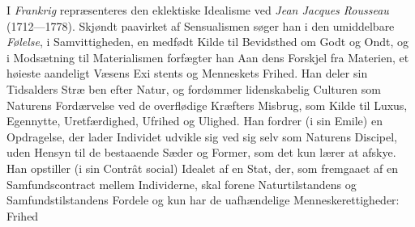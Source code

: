 \documentclass[12pt,a4paper]{book}
\begin{document}
I \emph{Frankrig} repræsenteres den eklektiske Idealisme ved
\emph{Jean Jacques Rousseau} (1712---1778). Skjøndt paavirket
af Sensualismen søger han i den umiddelbare \emph{Følelse}, i
Samvittigheden, en medfødt Kilde til Bevidsthed om Godt og
Ondt, og i Modsætning til Materialismen forfægter han Aan\-%
dens Forskjel fra Materien, et høieste aandeligt Væsens Exi\-%
stents og Menneskets Frihed. Han deler sin Tidsalders Stræ\-%
ben efter Natur, og fordømmer lidenskabelig Culturen som
Naturens Fordærvelse ved de overflødige Kræfters Misbrug,
som Kilde til Luxus, Egennytte, Uretfærdighed, Ufrihed og
Ulighed. Han fordrer (i sin Emile) en Opdragelse, der lader
Individet udvikle sig ved sig selv som Naturens Discipel, uden
Hensyn til de bestaaende Sæder og Former, som det kun
lærer at afskye. Han opstiller (i sin Contrât social) Idealet af
en Stat, der, som fremgaaet af en Samfundscontract mellem
Individerne, skal forene Naturtilstandens og Samfundstilstandens
Fordele og kun har de uafhændelige Menneskerettigheder: Frihed
\end{document}
